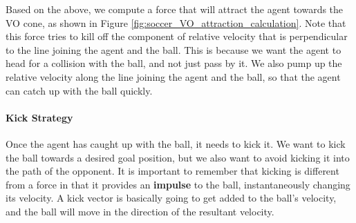 \documentclass[a4paper,12pt]{article}
\begin{document}


Based on the above, we compute a force that will attract the agent towards the VO cone, as shown in Figure \ref{fig:soccer_VO_attraction_calculation}. Note that this force tries to kill off the component of relative velocity that is perpendicular to the line joining the agent and the ball. This is because we want the agent to head for a collision with the ball, and not just pass by it. We also pump up the relative velocity along the line joining the agent and the ball, so that the agent can catch up with the ball quickly.

\paragraph{Kick Strategy}
\label{method_kick}
Once the agent has caught up with the ball, it needs to kick it. We want to kick the ball towards a desired goal position, but we also want to avoid kicking it into the path of the opponent. It is important to remember that kicking is different from a force in that it provides an \textbf{impulse} to the ball, instantaneously changing its velocity. A kick vector is basically going to get added to the ball's velocity, and the ball will move in the direction of the resultant velocity.
\end{document}
